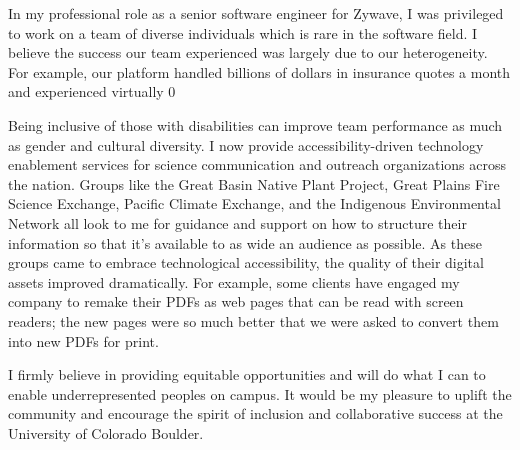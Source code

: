 \documentclass[12pt]{article}
\begin{document}
In my professional role as a senior software engineer for Zywave, I was privileged to work on a team of diverse individuals which is rare in the software field. I believe the success our team experienced was largely due to our heterogeneity. For example, our platform handled billions of dollars in insurance quotes a month and experienced virtually 0%

Being inclusive of those with disabilities can improve team performance as much as gender and cultural diversity. I now provide accessibility-driven technology enablement services for science communication and outreach organizations across the nation. Groups like the Great Basin Native Plant Project, Great Plains Fire Science Exchange, Pacific Climate Exchange, and the Indigenous Environmental Network all look to me for guidance and support on how to structure their information so that it's available to as wide an audience as possible. As these groups came to embrace technological accessibility, the quality of their digital assets improved dramatically. For example, some clients have engaged my company to remake their PDFs as web pages that can be read with screen readers; the new pages were so much better that we were asked to convert them into new PDFs for print.

I firmly believe in providing equitable opportunities and will do what I can to enable underrepresented peoples on campus. It would be my pleasure to uplift the community and encourage the spirit of inclusion and collaborative success at the University of Colorado Boulder.
\end{document}
